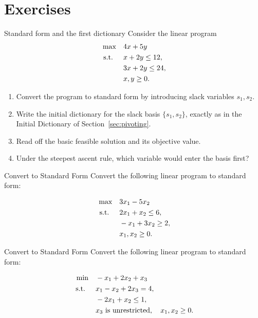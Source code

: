 \section{Exercises}


\begin{ex}{Standard form and the first dictionary}{}
\label{ex:standard-form-warmup-dictionary}
 Consider the linear program
\[
\begin{aligned}
\max \quad & 4x + 5y \\
\text{ s.t. } \quad
& x + 2y \leq 12, \\
& 3x + 2y \leq 24, \\
& x, y \geq 0.
\end{aligned}
\]
\begin{enumerate}
    \item Convert the program to standard form by introducing slack variables $s_1, s_2$.
    \item Write the initial dictionary for the slack basis $\{s_1, s_2\}$, exactly as in the Initial Dictionary of Section~\ref{sec:pivoting}.
    \item Read off the basic feasible solution and its objective value.
    \item Under the steepest ascent rule, which variable would enter the basis first?
\end{enumerate}
\end{ex}

\begin{ex}{Convert to Standard Form}{}
\label{ex:standard-form-1}
 Convert the following linear program to standard form:

\[
\begin{aligned}
    \max \quad & 3x_1 - 5x_2 \\
    \text{ s.t. } \quad
    & 2x_1 + x_2 \leq 6, \\
    & -x_1 + 3x_2 \geq 2, \\
    & x_1, x_2 \geq 0.
\end{aligned}
\]
\end{ex}

\begin{ex}{Convert to Standard Form}{}
\label{ex:standard-form-2}
 Convert the following linear program to standard form:

\[
\begin{aligned}
    \min \quad & -x_1 + 2x_2 + x_3 \\
    \text{ s.t. } \quad
    & x_1 - x_2 + 2x_3 = 4, \\
    & -2x_1 + x_2 \leq 1, \\
    & x_3 \text{ is unrestricted}, \quad x_1, x_2 \geq 0.
\end{aligned}
\]
\end{ex}


